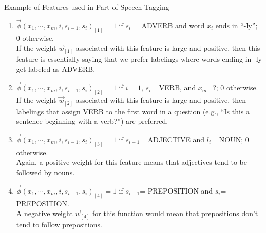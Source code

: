 \documentclass[handout]{beamer}
\begin{document}
\begin{frame}{Example of Features used in Part-of-Speech Tagging}
\begin{scriptsize}


\begin{enumerate}
 \item $\vec{\phi}(x_1, \cdots, x_m, i, s_{i-1},s_i)_{[1]}=1$ if $s_i$ = ADVERB and word $x_i$ ends in ``-ly''; 0 otherwise. \\ 
 
 If the weight $\vec{w}_{[1]}$ associated with this feature is large and positive, then this feature is essentially saying that we prefer labelings where words ending in -ly get labeled as ADVERB.
 
 \item $\vec{\phi}(x_1, \cdots, x_m, i, s_{i-1},s_i)_{[2]}=1$ if $i=1$, $s_i$= VERB, and $x_m$=?; 0 otherwise. 
 \\ If the weight $\vec{w}_{[2]}$ associated with this feature is large and positive, then labelings that assign VERB to the first word in a question (e.g., ``Is this a sentence beginning with a verb?'') are preferred.


\item $\vec{\phi}(x_1, \cdots, x_m, i, s_{i-1},s_i)_{[3]}=1$ if $s_{i-1}$= ADJECTIVE and $l_i$= NOUN; 0 otherwise. 
\\Again, a positive weight for this feature means that adjectives tend to be followed by nouns. 

\item $\vec{\phi}(x_1, \cdots, x_m, i, s_{i-1},s_i)_{[4]}=1$ if $s_{i-1}$= PREPOSITION and $s_{i}$= PREPOSITION. 
\\ A negative weight $\vec{w}_{[4]}$ for this function would mean that prepositions don't tend to follow prepositions.

 
\end{enumerate}



\end{scriptsize}
\end{frame}
\end{document}
